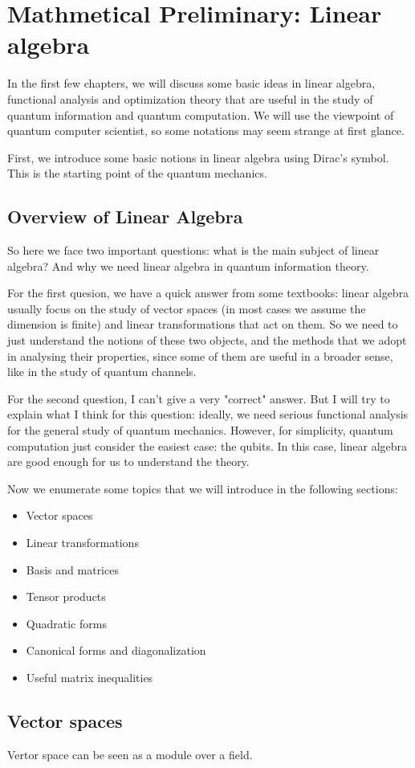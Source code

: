 \chapter{Mathmetical Preliminary: Linear algebra}

In the first few chapters, we will discuss some basic ideas in linear algebra, functional analysis and optimization theory that are useful in the study of quantum information and quantum computation. We will use the viewpoint of quantum computer scientist, so some notations may seem strange at first glance.

First, we introduce some basic notions in linear algebra using Dirac's symbol. This is the starting point of the quantum mechanics.

\section{Overview of Linear Algebra}

So here we face two important questions: what is the main subject of linear algebra? And why we need linear algebra in quantum information theory. 

For the first quesion, we have a quick answer from some textbooks: linear algebra usually focus on the study of vector spaces (in most cases we assume the dimension is finite) and linear transformations that act on them. So we need to just understand the notions of these two objects, and the methods that we adopt in analysing their properties, since some of them are useful in a broader sense, like in the study of quantum channels.

For the second question, I can't give a very "correct" answer. But I will try to explain what I think for this question: ideally, we need serious functional analysis for the general study of quantum mechanics. However, for simplicity, quantum computation just consider the easiest case: the qubits. In this case, linear algebra are good enough for us to understand the theory.

Now we enumerate some topics that we will introduce in the following sections:

\begin{itemize}
    \item Vector spaces
    \item Linear transformations
    \item Basis and matrices
    \item Tensor products
    \item Quadratic forms
    \item Canonical forms and diagonalization
    \item Useful matrix inequalities
\end{itemize}

\section{Vector spaces}

Vertor space can be seen as a module over a field.